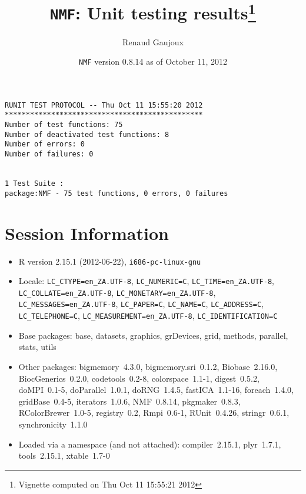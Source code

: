 \documentclass[10pt]{article}
\author{Renaud Gaujoux}
\title{\texttt{NMF}: Unit testing results\footnote{Vignette computed  on Thu Oct 11 15:55:21 2012}}
\date{\texttt{NMF} version 0.8.14 as of October 11, 2012}
\begin{document}
\maketitle

\begin{verbatim}
RUNIT TEST PROTOCOL -- Thu Oct 11 15:55:20 2012 
*********************************************** 
Number of test functions: 75 
Number of deactivated test functions: 8 
Number of errors: 0 
Number of failures: 0 

 
1 Test Suite : 
package:NMF - 75 test functions, 0 errors, 0 failures
\end{verbatim}

\section*{Session Information}
\begin{itemize}\raggedright
  \item R version 2.15.1 (2012-06-22), \verb|i686-pc-linux-gnu|
  \item Locale: \verb|LC_CTYPE=en_ZA.UTF-8|, \verb|LC_NUMERIC=C|, \verb|LC_TIME=en_ZA.UTF-8|, \verb|LC_COLLATE=en_ZA.UTF-8|, \verb|LC_MONETARY=en_ZA.UTF-8|, \verb|LC_MESSAGES=en_ZA.UTF-8|, \verb|LC_PAPER=C|, \verb|LC_NAME=C|, \verb|LC_ADDRESS=C|, \verb|LC_TELEPHONE=C|, \verb|LC_MEASUREMENT=en_ZA.UTF-8|, \verb|LC_IDENTIFICATION=C|
  \item Base packages: base, datasets, graphics, grDevices, grid,
    methods, parallel, stats, utils
  \item Other packages: bigmemory~4.3.0, bigmemory.sri~0.1.2,
    Biobase~2.16.0, BiocGenerics~0.2.0, codetools~0.2-8,
    colorspace~1.1-1, digest~0.5.2, doMPI~0.1-5, doParallel~1.0.1,
    doRNG~1.4.5, fastICA~1.1-16, foreach~1.4.0, gridBase~0.4-5,
    iterators~1.0.6, NMF~0.8.14, pkgmaker~0.8.3, RColorBrewer~1.0-5,
    registry~0.2, Rmpi~0.6-1, RUnit~0.4.26, stringr~0.6.1,
    synchronicity~1.1.0
  \item Loaded via a namespace (and not attached): compiler~2.15.1,
    plyr~1.7.1, tools~2.15.1, xtable~1.7-0
\end{itemize}
\end{document}
